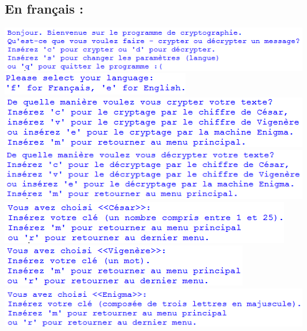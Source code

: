 \documentclass[a4paper,12pt,abstracton,titlepage]{scrartcl}
\begin{document}
\subsection{En français :}
{\raggedright
\includegraphics{./Pictures/interface/french/02_french_mainMenu.png}	%
\vspace{1cm}
\includegraphics{./Pictures/interface/settingsDialogue.png}		%
\vspace{1cm}
\includegraphics{./Pictures/interface/french/03_french_cryptage.png}	%
\vspace{1cm}
\includegraphics{./Pictures/interface/french/03_french_decryptage.png}	%
\vspace{1cm}
\includegraphics{./Pictures/interface/french/04_french_cesar.png}		%
\vspace{1cm}
\includegraphics{./Pictures/interface/french/04_french_vigenere.png}	%
\vspace{1cm}
\includegraphics{./Pictures/interface/french/04_french_enigma.png}		%
}
\end{document}

